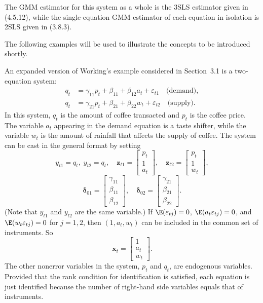 The GMM estimator for this system as a whole is the 3SLS estimator given in
(4.5.12), while the single-equation GMM estimator of each equation in isolation is
2SLS given in (3.8.3).

The following examples will be used to illustrate the concepts to be introduced
shortly.

\begin{example}\label{ex:8.1}
An expanded version of
Working's example considered in Section~3.1 is a two-equation system:
\begin{align}
  q_t &= \gamma_{11} p_t + \beta_{11} + \beta_{12} a_t + \varepsilon_{t1}
  \quad \text{(demand)},
  \label{eq:8.5.4} \tag{8.5.4} \\
  q_t &= \gamma_{21} p_t + \beta_{21} + \beta_{22} w_t + \varepsilon_{t2}
  \quad \text{(supply)}.
  \label{eq:8.5.5} \tag{8.5.5}
\end{align}
In this system, $q_t$ is the amount of coffee transacted and $p_t$ is the coffee price.
The variable $a_t$ appearing in the demand equation is a taste shifter, while the
variable $w_t$ is the amount of rainfall that affects the supply of coffee. The
system can be cast in the general format by setting
\[
  y_{t1} = q_t, \; y_{t2} = q_t, \quad
  \mathbf{z}_{t1} = \begin{bmatrix} p_t \\ 1 \\ a_t \end{bmatrix}, \quad
  \mathbf{z}_{t2} = \begin{bmatrix} p_t \\ 1 \\ w_t \end{bmatrix},
\]
\[
  \boldsymbol{\delta}_{01} = \begin{bmatrix} \gamma_{11} \\ \beta_{11} \\ \beta_{12} \end{bmatrix}, \quad
  \boldsymbol{\delta}_{02} = \begin{bmatrix} \gamma_{21} \\ \beta_{21} \\ \beta_{22} \end{bmatrix}.
\]
(Note that $y_{t1}$ and $y_{t2}$ are the same variable.) If $\E(\varepsilon_{tj}) = 0$,
$\E(a_t \varepsilon_{tj}) = 0$, and
$\E(w_t \varepsilon_{tj}) = 0$ for $j = 1, 2$, then $(1, a_t, w_t)$ can be included in the common
set of instruments. So
\[
  \mathbf{x}_t = \begin{bmatrix} 1 \\ a_t \\ w_t \end{bmatrix}.
\]
The other nonerror variables in the system, $p_t$ and $q_t$, are endogenous variables. Provided that the rank condition for identification is satisfied, each
equation is just identified because the number of right-hand side variables
equals that of instruments.
\end{example}

